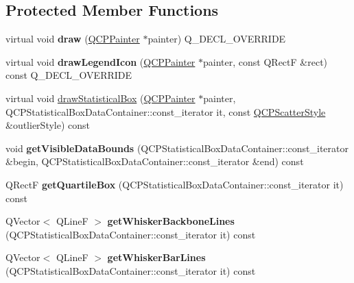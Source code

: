 \subsection*{Protected Member Functions}
\begin{DoxyCompactItemize}
\item 
\mbox{\label{class_q_c_p_statistical_box_afcff35fa79728cfe10e80e0702014fea}} 
virtual void {\bfseries draw} (\hyperlink{class_q_c_p_painter}{Q\+C\+P\+Painter} $\ast$painter) Q\+\_\+\+D\+E\+C\+L\+\_\+\+O\+V\+E\+R\+R\+I\+DE
\item 
\mbox{\label{class_q_c_p_statistical_box_ad286c63a79c21d5231a4b6c6fdbb914f}} 
virtual void {\bfseries draw\+Legend\+Icon} (\hyperlink{class_q_c_p_painter}{Q\+C\+P\+Painter} $\ast$painter, const Q\+RectF \&rect) const Q\+\_\+\+D\+E\+C\+L\+\_\+\+O\+V\+E\+R\+R\+I\+DE
\item 
virtual void \hyperlink{class_q_c_p_statistical_box_a02dc6b561be8203d460d7263da74b8a9}{draw\+Statistical\+Box} (\hyperlink{class_q_c_p_painter}{Q\+C\+P\+Painter} $\ast$painter, Q\+C\+P\+Statistical\+Box\+Data\+Container\+::const\+\_\+iterator it, const \hyperlink{class_q_c_p_scatter_style}{Q\+C\+P\+Scatter\+Style} \&outlier\+Style) const
\item 
\mbox{\label{class_q_c_p_statistical_box_a1c24e86384a4aced91d5216fce86b175}} 
void {\bfseries get\+Visible\+Data\+Bounds} (Q\+C\+P\+Statistical\+Box\+Data\+Container\+::const\+\_\+iterator \&begin, Q\+C\+P\+Statistical\+Box\+Data\+Container\+::const\+\_\+iterator \&end) const
\item 
\mbox{\label{class_q_c_p_statistical_box_aa44482bf991ceca74602294dd9977243}} 
Q\+RectF {\bfseries get\+Quartile\+Box} (Q\+C\+P\+Statistical\+Box\+Data\+Container\+::const\+\_\+iterator it) const
\item 
\mbox{\label{class_q_c_p_statistical_box_a233c28f8c2464ed104a4d580eedd4c64}} 
Q\+Vector$<$ Q\+LineF $>$ {\bfseries get\+Whisker\+Backbone\+Lines} (Q\+C\+P\+Statistical\+Box\+Data\+Container\+::const\+\_\+iterator it) const
\item 
\mbox{\label{class_q_c_p_statistical_box_af478f6e8a5e9ca2f1bbac10a6b73319a}} 
Q\+Vector$<$ Q\+LineF $>$ {\bfseries get\+Whisker\+Bar\+Lines} (Q\+C\+P\+Statistical\+Box\+Data\+Container\+::const\+\_\+iterator it) const
\end{DoxyCompactItemize}
